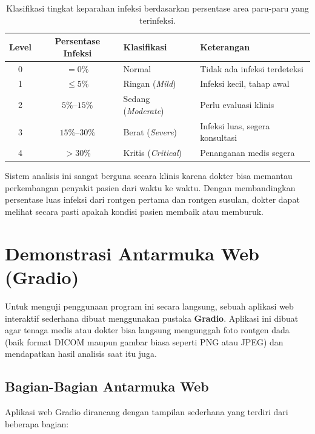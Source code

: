 \documentclass[12pt,a4paper,oneside]{book}
\begin{document}
\begin{table}[htbp]
  \centering
  \caption{Klasifikasi tingkat keparahan infeksi berdasarkan persentase area paru-paru yang terinfeksi.}
  \label{tab:severity_grading}
  \begin{tabularx}{\textwidth}{cclX}
    \toprule
    \textbf{Level} & \textbf{Persentase Infeksi} & \textbf{Klasifikasi} & \textbf{Keterangan} \\
    \midrule
    0 & $= 0\%$          & Normal             & Tidak ada infeksi terdeteksi \\
    1 & $\le 5\%$          & Ringan (\textit{Mild})    & Infeksi kecil, tahap awal \\
    2 & $5\%$--$15\%$    & Sedang (\textit{Moderate}) & Perlu evaluasi klinis \\
    3 & $15\%$--$30\%$   & Berat (\textit{Severe})   & Infeksi luas, segera konsultasi \\
    4 & $> 30\%$         & Kritis (\textit{Critical}) & Penanganan medis segera \\
    \bottomrule
  \end{tabularx}
\end{table}

Sistem analisis ini sangat berguna secara klinis karena dokter bisa memantau perkembangan penyakit pasien dari waktu ke waktu. Dengan membandingkan persentase luas infeksi dari rontgen pertama dan rontgen susulan, dokter dapat melihat secara pasti apakah kondisi pasien membaik atau memburuk.

\section{Demonstrasi Antarmuka Web (Gradio)}

Untuk menguji penggunaan program ini secara langsung, sebuah aplikasi web interaktif sederhana dibuat menggunakan pustaka \textbf{Gradio}. Aplikasi ini dibuat agar tenaga medis atau dokter bisa langsung mengunggah foto rontgen dada (baik format DICOM maupun gambar biasa seperti PNG atau JPEG) dan mendapatkan hasil analisis saat itu juga.

\subsection{Bagian-Bagian Antarmuka Web}

Aplikasi web Gradio dirancang dengan tampilan sederhana yang terdiri dari beberapa bagian:
\end{document}
